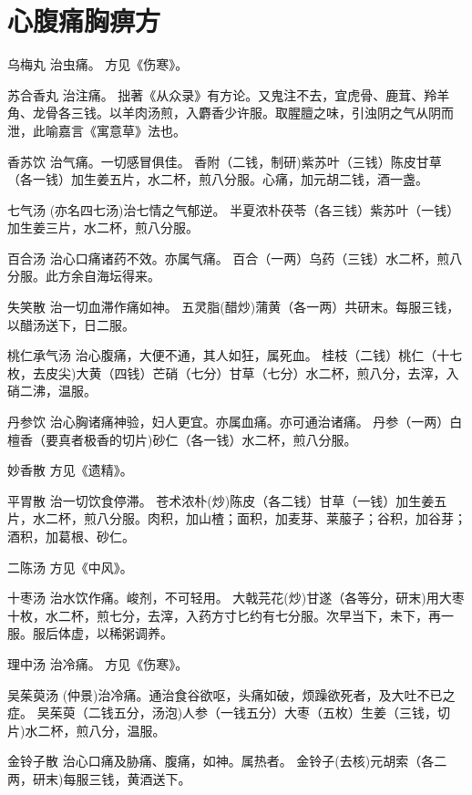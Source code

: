 \documentclass[a4paper,12pt,UTF8,twoside]{ctexbook}
\begin{document}
    \chapter{心腹痛胸痹方}
     乌梅丸
    治虫痛。
    方见《伤寒》。
    
    苏合香丸
    治注痛。
    拙著《从众录》有方论。又鬼注不去，宜虎骨、鹿茸、羚羊角、龙骨各三钱。以羊肉汤煎，入麝香少许服。取腥膻之味，引浊阴之气从阴而泄，此喻嘉言《寓意草》法也。
    
    香苏饮
    治气痛。一切感冒俱佳。
    香附（二钱，制研)紫苏叶（三钱）陈皮甘草（各一钱）加生姜五片，水二杯，煎八分服。心痛，加元胡二钱，酒一盏。
    
    七气汤
    (亦名四七汤)治七情之气郁逆。
    半夏浓朴茯苓（各三钱）紫苏叶（一钱）加生姜三片，水二杯，煎八分服。
    
    百合汤
    治心口痛诸药不效。亦属气痛。
    百合（一两）乌药（三钱）水二杯，煎八分服。此方余自海坛得来。
    
    失笑散
    治一切血滞作痛如神。
    五灵脂(醋炒)蒲黄（各一两）共研末。每服三钱，以醋汤送下，日二服。
    
    桃仁承气汤
    治心腹痛，大便不通，其人如狂，属死血。
    桂枝（二钱）桃仁（十七枚，去皮尖)大黄（四钱）芒硝（七分）甘草（七分）水二杯，煎八分，去滓，入硝二沸，温服。
    
    丹参饮
    治心胸诸痛神验，妇人更宜。亦属血痛。亦可通治诸痛。
    丹参（一两）白檀香（要真者极香的切片)砂仁（各一钱）水二杯，煎八分服。
    
    妙香散
    方见《遗精》。
    
    平胃散
    治一切饮食停滞。
    苍术浓朴(炒)陈皮（各二钱）甘草（一钱）加生姜五片，水二杯，煎八分服。肉积，加山楂；面积，加麦芽、莱菔子；谷积，加谷芽；酒积，加葛根、砂仁。
    
    二陈汤
    方见《中风》。
    
    十枣汤
    治水饮作痛。峻剂，不可轻用。
    大戟芫花(炒)甘遂（各等分，研末)用大枣十枚，水二杯，煎七分，去滓，入药方寸匕约有七分服。次早当下，未下，再一服。服后体虚，以稀粥调养。
    
    理中汤
    治冷痛。
    方见《伤寒》。
    
    吴茱萸汤
    (仲景)治冷痛。通治食谷欲呕，头痛如破，烦躁欲死者，及大吐不已之症。
    吴茱萸（二钱五分，汤泡)人参（一钱五分）大枣（五枚）生姜（三钱，切片)水二杯，煎八分，温服。
    
    金铃子散
    治心口痛及胁痛、腹痛，如神。属热者。
    金铃子(去核)元胡索（各二两，研末)每服三钱，黄酒送下。
    
\end{document}
